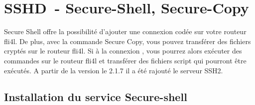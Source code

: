 
\section {SSHD~- Secure-Shell, Secure-Copy}

Secure Shell offre la possibilité d'ajouter une connexion codée sur votre
routeur fli4l. De plus, avec la commande Secure Copy, vous pouvez transférer
des fichiers cryptés sur le routeur fli4l. Si à la connexion
, vous pourrez alors
exécuter des commandes sur le routeur fli4l et transférer des fichiers script
qui pourront être exécutés. A partir de la version le 2.1.7 il a été rajouté
le serveur SSH2. 

\subsection {Installation du service Secure-shell}

